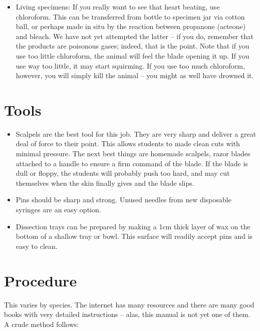 \begin{itemize}
\item{Living specimens: 
If you really want to see that heart beating, use chloroform. 
This can be transferred from bottle to specimen jar via cotton ball, 
or perhaps made in situ by the reaction between propanone (acteone) and bleach. 
We have not yet attempted the latter – 
if you do, remember that the products are poisonous gases; 
indeed, that is the point. Note that if you use too little chloroform, 
the animal will feel the blade opening it up. 
If you use way too little, it may start squirming. 
If you use too much chloroform, however, you will simply kill the animal – 
you might as well have drowned it.}

\end{itemize}

\section{Tools}

\begin{itemize}

\item{Scalpels are the best tool for this job. 
They are very sharp and deliver a great deal of force to their point. 
This allows students to made clean cuts with minimal pressure. 
The next best things are homemade scalpels, 
razor blades attached to a handle to ensure a firm command of the blade. 
If the blade is dull or floppy, the students will probably push too hard, 
and may cut themselves when the skin finally gives and the blade slips.}

\item{Pins should be sharp and strong. 
Unused needles from new disposable syringes are an easy option.}

\item{Dissection trays can be prepared 
by making a 1cm thick layer of wax on the bottom of a shallow tray or bowl. 
This surface will readily accept pins and is easy to clean.}

\end{itemize}

\section{Procedure}

This varies by species. The internet has many resources and there are many good books with very detailed instructions – alas, this manual is not yet one of them. A crude method follows:


